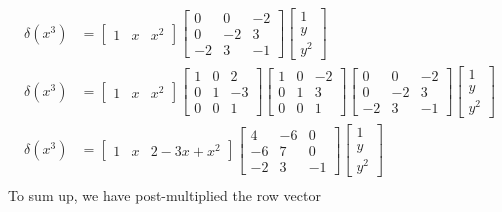 \documentclass{standalone}
\begin{document}
\begin{align} \nonumber %
	\delta(x^3) &=
	\begin{bmatrix}
			1 & x & x^2
	\end{bmatrix}
	\begin{bmatrix}
		0 & 0 & -2 \\
		0 & -2 & 3 \\
		-2 & 3 & -1
	\end{bmatrix}
	\begin{bmatrix}
		1 \\
		y \\
		y^2
	\end{bmatrix} \\ \nonumber %
	\delta(x^3) &=
	\begin{bmatrix}
		1 & x & x^2
	\end{bmatrix}
	\begin{bmatrix}
		1 & 0 & 2 \\
		0 & 1 & -3 \\
		0 & 0 & 1
	\end{bmatrix}
	\begin{bmatrix}
		1 & 0 & -2 \\
		0 & 1 & 3 \\
		0 & 0 & 1
	\end{bmatrix}
	\begin{bmatrix}
		0 & 0 & -2 \\
		0 & -2 & 3 \\
		-2 & 3 & -1
	\end{bmatrix}
	\begin{bmatrix}
		1 \\
		y \\
		y^2
	\end{bmatrix} \\ \nonumber %
	\delta(x^3) &=
	\begin{bmatrix}
			1 & x & 2 - 3x + x^2
	\end{bmatrix}
	\begin{bmatrix}
		4 & -6 & 0 \\
		-6 & 7 & 0 \\
		-2 & 3 & -1
	\end{bmatrix}
	\begin{bmatrix}
		1 \\
		y \\
		y^2
	\end{bmatrix} \\ \nonumber %
\end{align}
To sum up, we have post-multiplied the row vector
\end{document}
